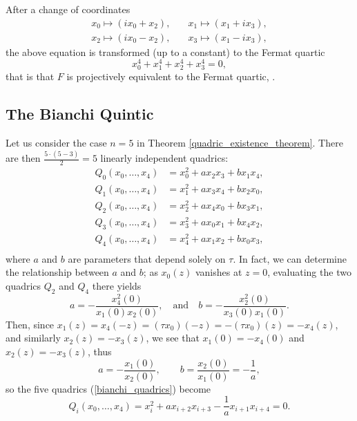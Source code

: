 After a change of coordinates
\begin{equation*}
	\begin{split}
	x_{0} \mapsto (ix_{0} + x_{2}),\quad & x_{1} \mapsto (x_{1} + ix_{3}),\\
	x_{2} \mapsto (ix_{0} - x_{2}),\quad & x_{3} \mapsto (x_{1} - ix_{3}),
	\end{split}
\end{equation*}
the above equation is transformed (up to a constant) to the Fermat quartic
\begin{equation*}
	x_{0}^{4} + x_{1}^{4} + x_{2}^{4} + x_{3}^{4} = 0,
\end{equation*}
that is that $F$ is projectively equivalent to the Fermat quartic, \cite{BHM_1985}.

\subsection{The Bianchi Quintic}

Let us consider the case $n = 5$ in Theorem \ref{quadric_existence_theorem}. There are then $\tfrac{5\cdot(5-3)}{2} = 5$ linearly independent quadrics:
\begin{equation}
\label{bianchi_quadrics}
	\begin{split}
	Q_{0}(x_{0},\ldots,x_{4}) &= x_{0}^{2} + ax_{2}x_{3} + bx_{1}x_{4},\\
	Q_{1}(x_{0},\ldots,x_{4}) &= x_{1}^{2} + ax_{3}x_{4} + bx_{2}x_{0},\\
	Q_{2}(x_{0},\ldots,x_{4}) &= x_{2}^{2} + ax_{4}x_{0} + bx_{3}x_{1},\\
	Q_{3}(x_{0},\ldots,x_{4}) &= x_{3}^{2} + ax_{0}x_{1} + bx_{4}x_{2},\\
	Q_{4}(x_{0},\ldots,x_{4}) &= x_{4}^{2} + ax_{1}x_{2} + bx_{0}x_{3},\\
	\end{split}
\end{equation}
where $a$ and $b$ are parameters that depend solely on $\tau$. In fact, we can determine the relationship between $a$ and $b$; as $x_{0}(z)$ vanishes at $z=0$, evaluating the two quadrics $Q_{2}$ and $Q_{4}$ there yields
\begin{equation*}
	a = -\frac{x_{4}^{2}(0)} {x_{1}(0)x_{2}(0)},\quad\text{and}\quad b = -\frac{x_{2}^{2}(0)} {x_{3}(0)x_{1}(0)}.
\end{equation*}
Then, since $x_{1}(z) = x_{4}(-z) = (\tau x_{0})(-z) = -(\tau x_{0})(z) = -x_{4}(z)$, and similarly $x_{2}(z) = -x_{3}(z)$, we see that $x_{1}(0) = -x_{4}(0)$ and $x_{2}(z) = -x_{3}(z)$, thus
\begin{equation}
	\label{bianchi_modular}
	a = -\frac{x_{1}(0)}{x_{2}(0)},\qquad b = \frac{x_{2}(0)}{x_{1}(0)} = -\frac{1}{a},
\end{equation}
so the five quadrics (\ref{bianchi_quadrics}) become
\begin{equation}
	\label{bianchi_quadric_intersection}
	Q_{i}(x_{0},\ldots,x_{4}) = x_{i}^{2} + a x_{i+2}x_{i+3} - \frac{1}{a}x_{i+1}x_{i+4} = 0.
\end{equation}

